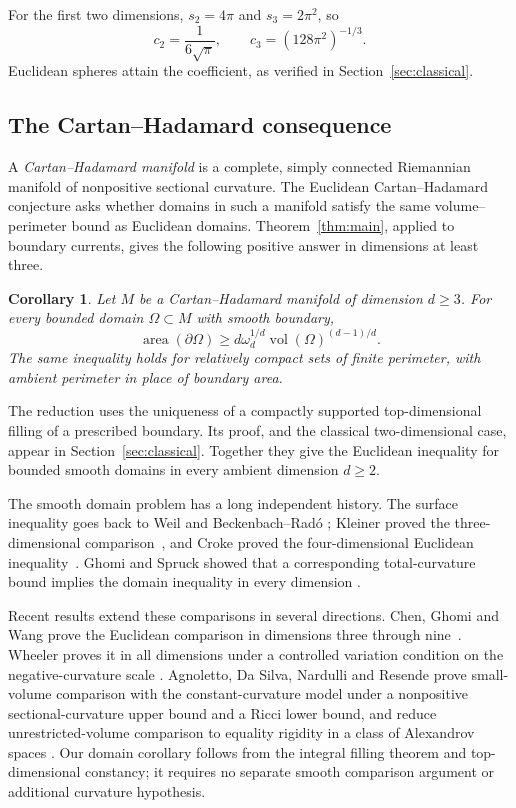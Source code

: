 \documentclass[11pt]{article}
\numberwithin{equation}{section}
\newtheorem{corollary}[theorem]{Corollary}
\theoremstyle{definition}
\theoremstyle{remark}
\newcommand{\vol}{\operatorname{vol}}
\begin{document}
For the first two dimensions, $s_2=4\pi$ and $s_3=2\pi^2$, so
\[
 c_2=\frac1{6\sqrt\pi},\qquad
 c_3=(128\pi^2)^{-1/3}.
\]
Euclidean spheres attain the coefficient, as verified in
Section~\ref{sec:classical}.

\subsection{The Cartan--Hadamard consequence}

A \emph{Cartan--Hadamard manifold} is a complete, simply connected
Riemannian manifold of nonpositive sectional curvature. The Euclidean
Cartan--Hadamard conjecture asks whether domains in such a manifold
satisfy the same volume--perimeter bound as Euclidean domains.
Theorem~\ref{thm:main}, applied to boundary currents, gives the
following positive answer in dimensions at least three.

\begin{corollary}\label{cor:cartan-hadamard}
Let $M$ be a Cartan--Hadamard manifold of dimension $d\ge3$.
For every bounded domain $\Omega\subset M$ with smooth boundary,
\begin{equation}\label{eq:classical}
 \operatorname{area}(\partial\Omega)
 \ge d\omega_d^{1/d}\vol(\Omega)^{(d-1)/d}.
\end{equation}
The same inequality holds for relatively compact sets of finite
perimeter, with ambient perimeter in place of boundary area.
\end{corollary}

The reduction uses the uniqueness of a compactly supported
top-dimensional filling of a prescribed boundary. Its proof, and the
classical two-dimensional case, appear in Section~\ref{sec:classical}.
Together they give the Euclidean inequality for bounded smooth domains
in every ambient dimension $d\ge2$.

The smooth domain problem has a long independent history. The surface
inequality goes back to Weil and Beckenbach--Rad\'o
\cite{Weil1926,BeckenbachRado1933}; Kleiner proved the
three-dimensional comparison~\cite{Kleiner1992}, and Croke proved
the four-dimensional Euclidean inequality~\cite{Croke1984}.
Ghomi and Spruck showed that a corresponding total-curvature bound
implies the domain inequality in every dimension
\cite[Theorem~7.1]{GhomiSpruck2022}.

Recent results extend these comparisons in several directions. Chen,
Ghomi and Wang prove the Euclidean comparison in dimensions three
through nine~\cite[Theorem~1.1]{ChenGhomiWang2026HigherDimensions}.
Wheeler proves it in all dimensions under a controlled variation
condition on the negative-curvature scale
\cite[Theorem~1.1 and Definition~1.2]{Wheeler2026}.
Agnoletto, Da Silva, Nardulli and Resende prove small-volume comparison
with the constant-curvature model under a nonpositive sectional-curvature
upper bound and a Ricci lower bound,
and reduce unrestricted-volume comparison to equality rigidity in a
class of Alexandrov spaces
\cite[Theorems~1.1 and~1.3; Assumption~1]{AgnolettoDaSilvaNardulliResende2026}.
Our domain corollary follows from the integral filling theorem and
top-dimensional constancy; it requires no separate smooth comparison
argument or additional curvature hypothesis.
\end{document}
